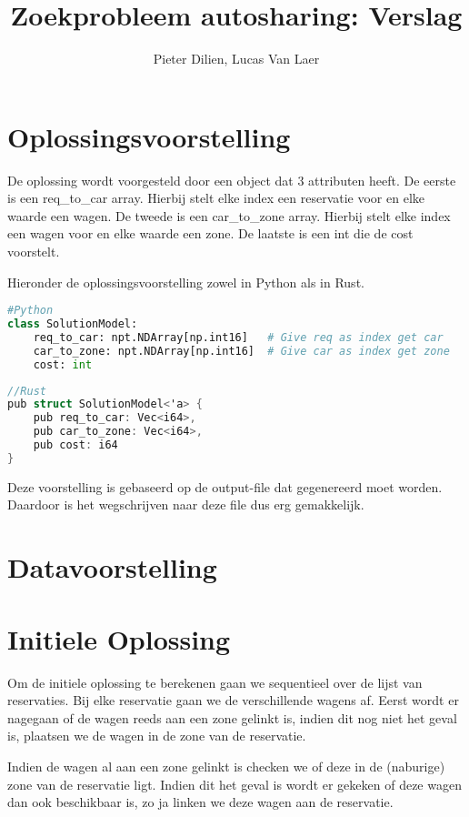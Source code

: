 \documentclass[a4paper, 12pt, one column]{article}
\title{Zoekprobleem autosharing: Verslag}
\author{Pieter Dilien, Lucas Van Laer}
\begin{document}
\maketitle

\section{Oplossingsvoorstelling}
De oplossing wordt voorgesteld door een object dat 3 attributen heeft. De eerste is een req\_to\_car array. Hierbij stelt elke index een reservatie voor en elke waarde een wagen. De tweede is een car\_to\_zone array. Hierbij stelt elke index een wagen voor en elke waarde een zone. De laatste is een int die de cost voorstelt.

Hieronder de oplossingsvoorstelling zowel in Python als in Rust.
\begin{lstlisting}[language=Python]
#Python
class SolutionModel:
    req_to_car: npt.NDArray[np.int16]   # Give req as index get car
    car_to_zone: npt.NDArray[np.int16]  # Give car as index get zone
    cost: int
\end{lstlisting}

\begin{lstlisting}[language=C]
//Rust
pub struct SolutionModel<'a> {
    pub req_to_car: Vec<i64>,
    pub car_to_zone: Vec<i64>,
    pub cost: i64
}
\end{lstlisting}

Deze voorstelling is gebaseerd op de output-file dat gegenereerd moet worden. Daardoor is het wegschrijven naar deze file dus erg gemakkelijk.

\section{Datavoorstelling}

\section{Initiele Oplossing}
Om de initiele oplossing te berekenen gaan we sequentieel over de lijst van reservaties. Bij elke reservatie gaan we de verschillende wagens af. Eerst wordt er nagegaan of de wagen reeds aan een zone gelinkt is, indien dit nog niet het geval is, plaatsen we de wagen in de zone van de reservatie. 

Indien de wagen al aan een zone gelinkt is checken we of deze in de (naburige) zone van de reservatie ligt. Indien dit het geval is wordt er gekeken of deze wagen dan ook beschikbaar is, zo ja linken we deze wagen aan de reservatie.
\end{document}
